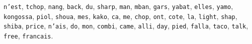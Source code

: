\texttt{n'est}, \texttt{tchop}, \texttt{nang}, \texttt{back}, \texttt{du}, \texttt{sharp}, \texttt{man}, \texttt{mban}, \texttt{gars}, \texttt{yabat}, \texttt{elles}, \texttt{yamo}, \texttt{kongossa}, \texttt{piol}, \texttt{shoua}, \texttt{mes}, \texttt{kako}, \texttt{ca}, \texttt{me}, \texttt{chop}, \texttt{ont}, \texttt{cote}, \texttt{la}, \texttt{light}, \texttt{shap}, \texttt{shiba}, \texttt{price}, \texttt{n'ais}, \texttt{do}, \texttt{mon}, \texttt{combi}, \texttt{came}, \texttt{alli}, \texttt{day}, \texttt{pied}, \texttt{falla}, \texttt{taco}, \texttt{talk}, \texttt{free}, \texttt{francais}.
